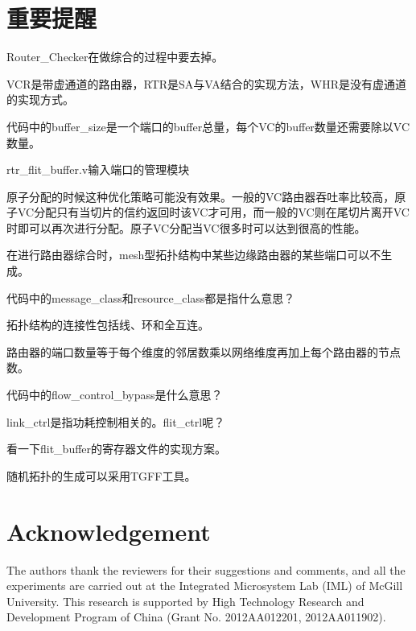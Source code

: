 \documentclass[10pt,journal]{IEEEtran}
\begin{document}
\section{重要提醒}
Router\_Checker在做综合的过程中要去掉。

VCR是带虚通道的路由器，RTR是SA与VA结合的实现方法，WHR是没有虚通道的实现方式。

代码中的buffer\_size是一个端口的buffer总量，每个VC的buffer数量还需要除以VC数量。

rtr\_flit\_buffer.v输入端口的管理模块

原子分配的时候这种优化策略可能没有效果。一般的VC路由器吞吐率比较高，原子VC分配只有当切片的信约返回时该VC才可用，而一般的VC则在尾切片离开VC时即可以再次进行分配。原子VC分配当VC很多时可以达到很高的性能。

在进行路由器综合时，mesh型拓扑结构中某些边缘路由器的某些端口可以不生成。

代码中的message\_class和resource\_class都是指什么意思？

拓扑结构的连接性包括线、环和全互连。

路由器的端口数量等于每个维度的邻居数乘以网络维度再加上每个路由器的节点数。

代码中的flow\_control\_bypass是什么意思？

link\_ctrl是指功耗控制相关的。flit\_ctrl呢？

看一下flit\_buffer的寄存器文件的实现方案。

随机拓扑的生成可以采用TGFF工具。

\section*{Acknowledgement}
The authors thank the reviewers for their suggestions and comments, and all the experiments are carried out at the Integrated Microsystem Lab (IML) of McGill University. This research is supported by High Technology Research and Development Program of China (Grant No. 2012AA012201, 2012AA011902).



\end{document}
